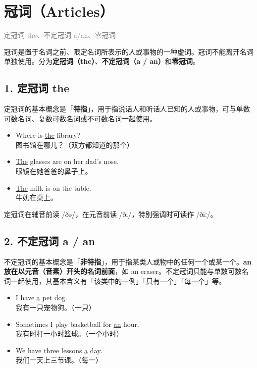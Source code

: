 \documentclass[11pt,a4paper]{ctexart}
\begin{document}
\begin{center}\end{center}

\section{冠词（Articles）}
\noindent\textcolor{gray}{定冠词 the、不定冠词 a/an、零冠词}\par\smallskip
冠词是置于名词之前、限定名词所表示的人或事物的一种虚词。冠词不能离开名词单独使用。分为\textbf{定冠词（the）}、\textbf{不定冠词（a / an）}和\textbf{零冠词}。

\subsection*{1. 定冠词 the}

定冠词的基本概念是「\textbf{特指}」，用于指说话人和听话人已知的人或事物，可与单数可数名词、复数可数名词或不可数名词一起使用。

\begin{itemize}[leftmargin=1.4em]
\item Where is \underline{the} library?\\ 图书馆在哪儿？（双方都知道的那个）
\item \underline{The} glasses are on her dad’s nose.\\ 眼镜在她爸爸的鼻子上。
\item \underline{The} milk is on the table.\\ 牛奶在桌上。
\end{itemize}

定冠词在辅音前读 /ðə/，在元音前读 /ði/，特别强调时可读作 /ðiː/。

\subsection*{2. 不定冠词 a / an}

不定冠词的基本概念是「\textbf{非特指}」，用于指某类人或物中的任何一个或某一个。\textbf{an 放在以元音（音素）开头的名词前面}，如 an eraser。不定冠词只能与单数可数名词一起使用，其基本含义有「该类中的一例」「只有一个」「每一个」等。

\begin{itemize}[leftmargin=1.4em]
\item I have \underline{a} pet dog.\\ 我有一只宠物狗。（一只）
\item Sometimes I play basketball for \underline{an} hour.\\ 我有时打一小时篮球。（一个小时）
\item We have three lessons \underline{a} day.\\ 我们一天上三节课。（每一）
\end{itemize}
\end{document}

